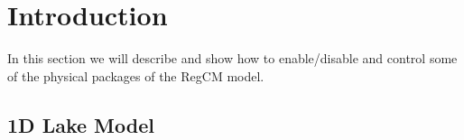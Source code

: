 %
%

\section{Introduction}

In this section we will describe and show how to enable/disable and control
some of the physical packages of the RegCM model.

\subsection{1D Lake Model}
\label{lakemodel}

